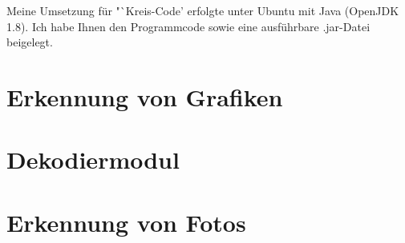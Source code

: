 \documentclass[parskip=full]{scrreprt}
\newcommand{\task}[1]{Kreis-Code}
\begin{document}
	\titlehead{Teilnahme 6745 (Team 00001) \hfill Laurenz Grote}
	\title{\task}
	\subtitle{Aufgabe 3}
	\author{Laurenz Friedrich Grote}
	\date{}
	\maketitle
	\tableofcontents
	
	\vspace {2em}
	Meine Umsetzung für "`\task"' erfolgte unter Ubuntu mit Java (OpenJDK 1.8). Ich habe Ihnen den Programmcode sowie eine ausführbare .jar-Datei beigelegt.
	\pagebreak
	\chapter{Erkennung von Grafiken}
		
	\chapter{Dekodiermodul}
		
	\chapter{Erkennung von Fotos}
		
\end{document}
